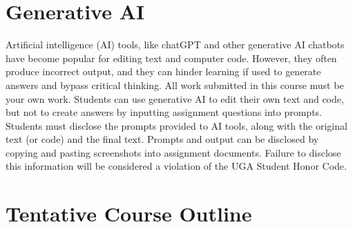 \documentclass[12pt]{article}
\begin{document}
\vspace{-12pt}
\section*{\normalsize Generative AI}
\vspace{-4mm}


Artificial intelligence (AI) tools, like chatGPT and other generative AI
chatbots have become popular for editing text and computer code. However,
they often produce incorrect output, and they can hinder learning if
used to generate answers and bypass critical thinking. All work
submitted in this course must be your own work. 
Students can use generative AI to edit their own text and code,
but not to create answers by inputting assignment
questions into prompts. Students must disclose the prompts provided to 
AI tools, along with the original text (or code) and the final
text. Prompts and output can be disclosed by copying and pasting
screenshots into assignment documents. Failure to disclose this
information will be considered a violation of the UGA Student Honor
Code. 




\clearpage

\section*{\normalsize Tentative Course Outline}
\end{document}
